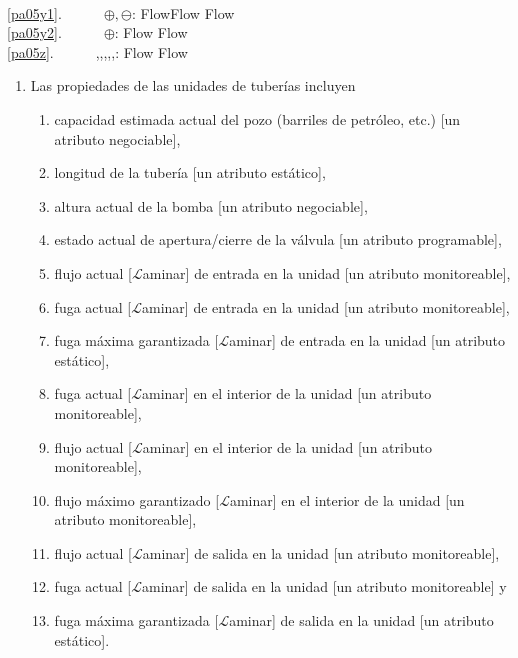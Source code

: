 \bp
\>\ \\
\ref{pa05y1}.\ \ \ \ \ \ $\oplus,\ominus$: Flow{\TIMES}Flow {\RIGHTARROW} Flow \\
\ref{pa05y2}.\ \ \ \ \ \ $\oplus$: Flow {\RIGHTARROW} Flow\ \ \\
\ref{pa05z}.\ \ \ \ \ \ {\LT},{\LEQ},{\EQ},{\NOTEQ},{\GEQ},{\GT}: Flow {\TIMES} Flow {\RIGHTARROW} 
\ep
{}%
%
%
%
%
\mnewfoil
\begin{enumerate}\setei
\item \label{pa00} Las propiedades de las unidades de tuberías incluyen
\begin{enumerate}
\item \label{pa01} capacidad estimada actual del pozo (barriles de petróleo,
  etc.) [un atributo negociable], 
\item \label{pa02} longitud de la tubería [un atributo estático],
\item \label{pa03} altura actual de la bomba [un atributo negociable], 
\item \label{pa04} estado actual de apertura/cierre de la válvula [un atributo programable],
\item \label{pa05} flujo actual [$\mathcal{L}$aminar] de entrada en la unidad
                   [un atributo monitoreable],
\item \label{pa06} fuga actual [$\mathcal{L}$aminar] de entrada en la unidad
                   [un atributo monitoreable],
\item \label{pa07} fuga máxima garantizada [$\mathcal{L}$aminar] de entrada en la unidad
  [un atributo estático],
\mnewfoil
\item \label{pa08} fuga actual [$\mathcal{L}$aminar] en el interior de la unidad
                   [un atributo monitoreable],
\item \label{pa09} flujo actual [$\mathcal{L}$aminar] en el interior de la unidad
                   [un atributo monitoreable],
\item \label{pa10} flujo máximo garantizado [$\mathcal{L}$aminar] en el interior de la unidad
                   [un atributo monitoreable],
\item \label{pa11} flujo actual [$\mathcal{L}$aminar] de salida en la unidad
                   [un atributo monitoreable],
\item \label{pa12} fuga actual [$\mathcal{L}$aminar] de salida en la unidad
                   [un atributo monitoreable] y
\item \label{pa13} fuga máxima garantizada [$\mathcal{L}$aminar] de salida en la unidad
                   [un atributo estático].
\end{enumerate}
\savei\end{enumerate}
